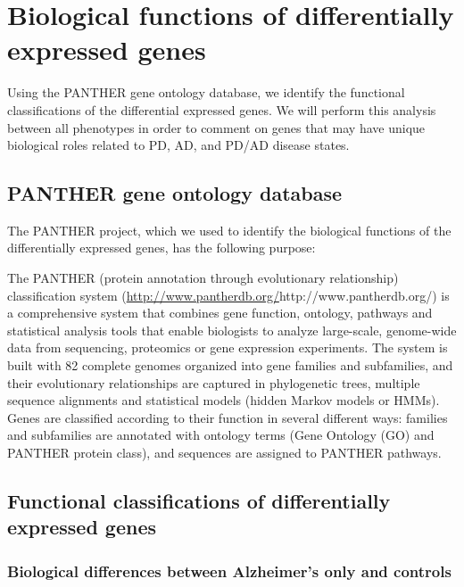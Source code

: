 \section{Biological functions of differentially expressed genes}
\label{sec:biol-funct-diff}

Using the PANTHER gene ontology database, we identify the functional classifications of the differential expressed genes. We will perform this analysis between all phenotypes in order to comment on genes that may have unique biological roles related to PD, AD, and PD/AD disease states.



\subsection{PANTHER gene ontology database}
\label{subsec:panth-gene-ontol}

The PANTHER project, which we used to identify the biological functions of the differentially expressed genes, has the following purpose\cite{PANTHER}:\\

\begin{blockquote}
  The PANTHER (protein annotation through evolutionary relationship) classification system (\url{http://www.pantherdb.org/}{http://www.pantherdb.org/}) is a comprehensive system that combines gene function, ontology, pathways and statistical analysis tools that enable biologists to analyze large-scale, genome-wide data from sequencing, proteomics or gene expression experiments. The system is built with 82 complete genomes organized into gene families and subfamilies, and their evolutionary relationships are captured in phylogenetic trees, multiple sequence alignments and statistical models (hidden Markov models or HMMs). Genes are classified according to their function in several different ways: families and subfamilies are annotated with ontology terms (Gene Ontology (GO) and PANTHER protein class), and sequences are assigned to PANTHER pathways.
\end{blockquote}

\subsection{Functional classifications of differentially expressed genes}
\label{subsec:funct-class-diff}

\subsubsection{Biological differences between Alzheimer's only and controls}
\label{subsubsec:biol-diff-betw}

